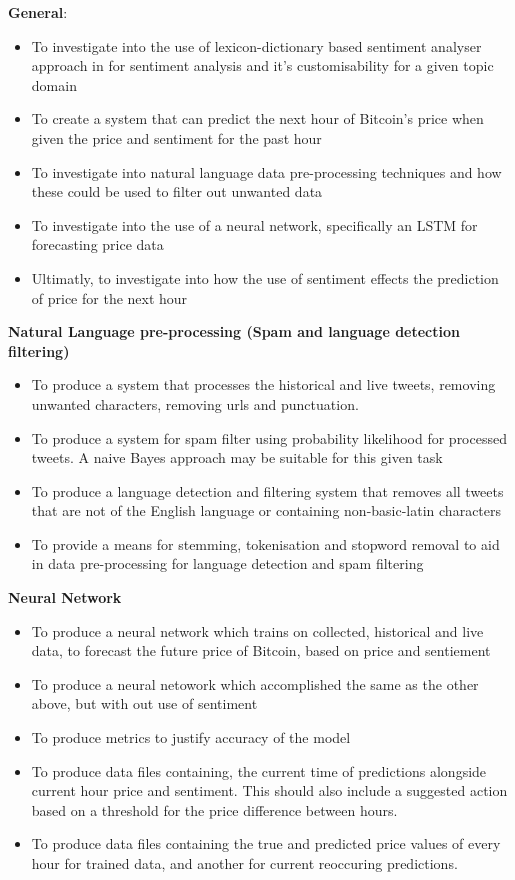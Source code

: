 \documentclass[oneside, 12pt]{article}
\begin{document}
		\textbf{General}:
		\begin{itemize}
			\item To investigate into the use of lexicon-dictionary based sentiment analyser approach in for sentiment analysis and it's customisability for a given topic domain
			\item To create a system that can predict the next hour of Bitcoin’s price when given the price and sentiment for the past hour
			\item To investigate into natural language data pre-processing techniques and how these could be used to filter out unwanted data
			\item To investigate into the use of a neural network, specifically an LSTM for forecasting price data
			\item Ultimatly, to investigate into how the use of sentiment effects the prediction of price for the next hour
			\newline
		\end{itemize}
		
	
		\textbf{Natural Language pre-processing (Spam and language detection filtering)}
		\begin{itemize}
			\item To produce a system that processes the historical and live tweets, removing unwanted characters, removing urls and punctuation.
			\item To produce a system for spam filter using probability likelihood for processed tweets. A naive Bayes approach may be suitable for this given task
			\item To produce a language detection and filtering system that removes all tweets that are not of the English language or containing non-basic-latin characters
			\item To provide a means for stemming, tokenisation and stopword removal to aid in data pre-processing for language detection and spam filtering
			\newline
		\end{itemize}
		
		\textbf{Neural Network}
		\begin{itemize}
			\item To produce a neural network which trains on collected, historical and live data, to forecast the future price of Bitcoin, based on price and sentiement
			\item To produce a neural netowork which accomplished the same as the other above, but with out use of sentiment
			\item To produce metrics to justify accuracy of the model
			\item To produce data files containing, the current time of predictions alongside current hour price and sentiment. This should also include a suggested action based on a threshold for the price difference between hours. 
			\item To produce data files containing the true and predicted price values of every hour for trained data, and another for current reoccuring predictions.
			\newline
		\end{itemize}
		
\end{document}

